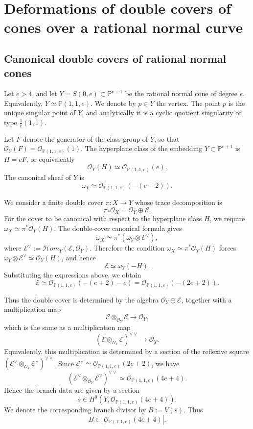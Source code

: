 \documentclass[11pt,twoside]{amsart}
\theoremstyle{plain}
\numberwithin{equation}{section}
\theoremstyle{definition}
\begin{document}
\section{Deformations of double covers of cones over a rational normal curve}

\subsection{Canonical double covers of rational normal cones}

Let $e>4$, and let $Y=S(0,e)\subset \mathbb{P}^{e+1}$ be the rational normal cone of degree $e$. Equivalently, $Y\simeq \mathbb{P}(1,1,e)$. We denote by $p\in Y$ the vertex. The point $p$ is the unique singular point of $Y$, and analytically it is a cyclic quotient singularity of type $\frac{1}{e}(1,1)$.

Let $F$ denote the generator of the class group of $Y$, so that $\mathcal{O}_{Y}(F)=\mathcal{O}_{\mathbb{P}(1,1,e)}(1)$. The hyperplane class of the embedding $Y\subset \mathbb{P}^{e+1}$ is $H=eF$, or equivalently
$$
\mathcal{O}_{Y}(H)\simeq \mathcal{O}_{\mathbb{P}(1,1,e)}(e).
$$
The canonical sheaf of $Y$ is
$$
\omega_{Y}\simeq \mathcal{O}_{\mathbb{P}(1,1,e)}(-(e+2)).
$$

We consider a finite double cover $\pi:X\to Y$ whose trace decomposition is
$$
\pi_{*}\mathcal{O}_{X}=\mathcal{O}_{Y}\oplus \mathcal{E}.
$$
For the cover to be canonical with respect to the hyperplane class $H$, we require $\omega_{X}\simeq \pi^*\mathcal{O}_{Y}(H)$. The double-cover canonical formula gives
$$
\omega_{X}\simeq \pi^*(\omega_{Y}\otimes \mathcal{E}^{\vee}),
$$
where $\mathcal{E}^{\vee}:=\mathcal{H}om_{Y}(\mathcal{E},\mathcal{O}_{Y})$. Therefore the condition $\omega_{X}\simeq \pi^*\mathcal{O}_{Y}(H)$ forces $\omega_{Y}\otimes \mathcal{E}^{\vee}\simeq \mathcal{O}_{Y}(H)$, and hence
$$
\mathcal{E}\simeq \omega_{Y}(-H).
$$
Substituting the expressions above, we obtain
$$
\mathcal{E}
\simeq
\mathcal{O}_{\mathbb{P}(1,1,e)}(-(e+2)-e)
= \mathcal{O}_{\mathbb{P}(1,1,e)}(-(2e+2)).
$$

Thus the double cover is determined by the algebra $\mathcal{O}_{Y}\oplus\mathcal{E}$, together with a multiplication map
$$
\mathcal{E}\otimes_{\mathcal{O}_{Y}}\mathcal{E}\longrightarrow \mathcal{O}_{Y}.
$$
which is the same as a multiplication map 
$$
(\mathcal{E}\otimes_{\mathcal{O}_{Y}}\mathcal{E})^{\vee \vee}\longrightarrow \mathcal{O}_{Y}.
$$
Equivalently, this multiplication is determined by a section of the reflexive square $(\mathcal{E}^{\vee}\otimes_{\mathcal{O}_{Y}}\mathcal{E}^{\vee})^{\vee\vee}$. Since $\mathcal{E}^{\vee}\simeq \mathcal{O}_{\mathbb{P}(1,1,e)}(2e+2)$, we have
$$
(\mathcal{E}^{\vee}\otimes_{\mathcal{O}_{Y}}\mathcal{E}^{\vee})^{\vee\vee}
\simeq
\mathcal{O}_{\mathbb{P}(1,1,e)}(4e+4).
$$
Hence the branch data are given by a section
$$
s\in H^0\left(Y,\mathcal{O}_{\mathbb{P}(1,1,e)}(4e+4)\right).
$$
We denote the corresponding branch divisor by $B:=V(s)$. Thus
$$
B\in \left|\mathcal{O}_{\mathbb{P}(1,1,e)}(4e+4)\right|.
$$
\end{document}

